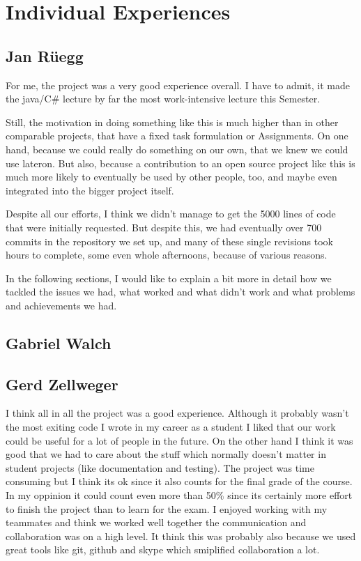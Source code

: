 \section{Individual Experiences}
\label{individual}

\subsection{Jan Rüegg}
\label{individual:jan}
For me, the project was a very good experience overall. I have to admit, it made the java/C\# lecture by far the most work-intensive lecture this Semester.

Still, the motivation in doing something like this is much higher than in other comparable projects, that have a fixed task formulation or Assignments. On one hand, because we could really do something on our own, that we knew we could use lateron. But also, because a contribution to an open source project like this is much more likely to eventually be used by other people, too, and maybe even integrated into the bigger project itself.

Despite all our efforts, I think we didn't manage to get the 5000 lines of code that were initially requested. But despite this, we had eventually over 700 commits in the repository we set up, and many of these single revisions took hours to complete, some even whole afternoons, because of various reasons.

In the following sections, I would like to explain a bit more in detail how we tackled the issues we had, what worked and what didn't work and what problems and achievements we had.

\subsection{Gabriel Walch}
\label{individual:gabriel}

\subsection{Gerd Zellweger}
\label{individual:gerd}
I think all in all the project was a good experience. Although it probably wasn't the most exiting code I wrote in my career as a student I liked that our work could be useful for a lot of people in the future. On the other hand I think it was good that we had to care about the stuff which normally doesn't matter in student projects (like documentation and testing). The project was time consuming but I think its ok since it also counts for the final grade of the course. In my oppinion it could count even more than 50\% since its certainly more effort to finish the project than to learn for the exam.
I enjoyed working with my teammates and think we worked well together the communication and collaboration was on a high level. It think this was probably also because we used great tools like git, github and skype which smiplified collaboration a lot.


